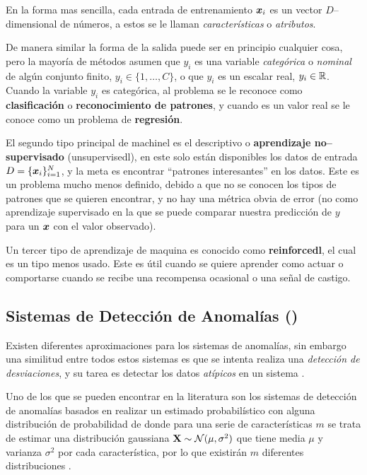 En la forma mas sencilla, cada entrada de entrenamiento ${\bm{x}}_i$ es un vector $D$--dimensional de números, a estos se le llaman \emph{características} o \emph{atributos}.

De manera similar la forma de la salida puede ser en principio cualquier cosa, pero la mayoría de métodos asumen que $y_i$ es una variable \emph{categórica} o \emph{nominal} de algún conjunto finito, $y_i \in \{1,\ldots,C\}$, o que $y_i$ es un escalar real, $y_i \in \mathbb{R}$. Cuando la variable $y_i$ es categórica, al problema se le reconoce como \textbf{clasificación} o \textbf{reconocimiento de patrones}, y cuando es un valor real se le conoce como un problema de \textbf{regresión}.

El segundo tipo principal de \gls{machinel} es el descriptivo o \textbf{aprendizaje no--supervisado} (\gls{unsupervisedl}), en este solo están disponibles los datos de entrada $D = \{{\bm{x}}_i\}_{i=1}^{N}$, y la meta es encontrar ``patrones interesantes'' en los datos. Este es un problema mucho menos definido, debido a que no se conocen los tipos de patrones que se quieren encontrar, y no hay una métrica obvia de error (no como aprendizaje supervisado en la que se puede comparar nuestra predicción de $y$ para un ${\bm{x}}$ con el valor observado).

Un tercer tipo de aprendizaje de maquina es conocido como \textbf{\gls{reinforcedl}}, el cual es un tipo menos usado. Este es útil cuando se quiere aprender como actuar o comportarse cuando se recibe una recompensa ocasional o una señal de castigo.

\subsection{Sistemas de Detección de Anomalías ()}
Existen diferentes aproximaciones para los sistemas de anomalías, sin embargo una similitud entre todos estos sistemas es que se intenta realiza una \emph{detección de desviaciones}, y su tarea es detectar los datos \emph{atípicos} en un sistema \cite{tan2005introduction}.

Uno de los que se pueden encontrar en la literatura son los sistemas de detección de anomalías basados en realizar un estimado probabilístico con alguna distribución de probabilidad de donde para una serie de características $m$ se trata de estimar una distribución gaussiana ${\mathbf{X}} \sim \mathcal{N}(\mu, \sigma^2)$ que tiene media $\mu$ y varianza $\sigma^2$ por cada característica, por lo que existirán $m$ diferentes distribuciones .

